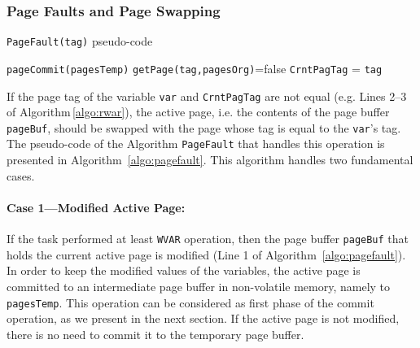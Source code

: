 \subsubsection{Page Faults and Page Swapping}

\begin{algorithm}[t]
	\caption{\texttt{PageFault(tag)} pseudo-code}
	\label{algo:pagefault}
	\scriptsize
	\begin{algorithmic}[1]
			
		\State \texttt{pageCommit(pagesTemp)} 
		\EndIf
		 
		 
		\Else
		\State \texttt{getPage(tag,pagesOrg)}=false 
		\EndIf 
		\State \texttt{CrntPagTag} = \texttt{tag} 
	\end{algorithmic}
\end{algorithm}

If the page tag of the variable \texttt{var} and \texttt{CrntPagTag} are not equal (e.g. Lines 2--3 of Algorithm\,\ref{algo:rwar}), the active page, i.e. the contents of the page buffer \texttt{pageBuf}, should be swapped with the page whose tag is equal to the \texttt{var}'s tag. The pseudo-code of the Algorithm \texttt{PageFault} that handles this operation is presented in Algorithm~\ref{algo:pagefault}. This algorithm handles two fundamental cases.

\paragraph{Case 1---Modified Active Page:} If the task performed at least \texttt{WVAR} operation, then the page buffer \texttt{pageBuf} that holds the current active page is modified (Line 1 of Algorithm~\ref{algo:pagefault}). In order to keep the modified values of the variables, the active page is committed to an intermediate page buffer in non-volatile memory, namely to \texttt{pagesTemp}. This operation can be considered as first phase of the commit operation, as we present in the next section. If the active page is not modified, there is no need to commit it to the temporary page buffer.

